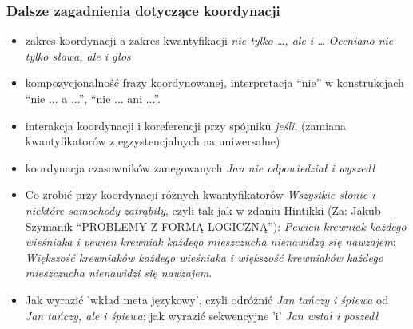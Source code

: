 \documentclass[12pt]{mwart}
\theoremstyle{remark}
\begin{document}
\subsubsection{Dalsze zagadnienia dotyczące koordynacji}
\begin{itemize}
\item zakres koordynacji a zakres kwantyfikacji {\it nie tylko \dots, ale i \dots} {\it Oceniano nie tylko słowa, ale i głos}
\item kompozycjonalność frazy koordynowanej,
interpretacja ``nie'' w konstrukcjach ``nie ... a ...'', ``nie ... ani ...''.
\item interakcja koordynacji i koreferencji przy spójniku {\it jeśli}, (zamiana kwantyfikatorów z egzystencjalnych na uniwersalne)
\item koordynacja czasowników zanegowanych {\it Jan nie odpowiedział i wyszedł}
\item  Co zrobić przy koordynacji różnych kwantyfikatorów {\it Wszystkie słonie i niektóre samochody zatrąbiły}, czyli
tak jak w zdaniu Hintikki (Za: Jakub Szymanik ``PROBLEMY Z FORMĄ LOGICZNĄ''): 
{\it Pewien krewniak każdego wieśniaka i pewien krewniak każdego mieszczucha nienawidzą się nawzajem};
{\it Większość krewniaków każdego wieśniaka i większość krewniaków każdego mieszczucha nienawidzi się nawzajem}.
\item Jak wyrazić 'wkład meta językowy', czyli odróżnić {\it Jan tańczy i śpiewa} od {\it Jan tańczy, ale i śpiewa};
jak wyrazić sekwencyjne 'i' {\it Jan wstał i poszedł}
\end{itemize}
\end{document}

